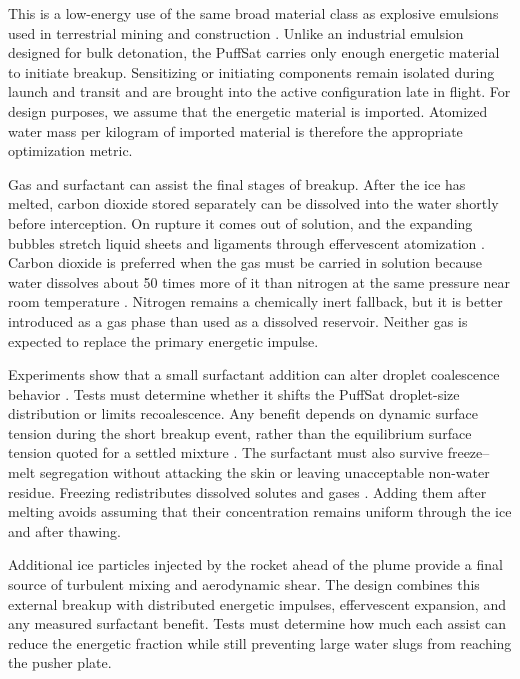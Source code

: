 \documentclass{article}
\begin{document}
This is a low-energy use of the same broad material class as explosive emulsions used in terrestrial mining and construction \cite{emulsion_tutorial}. Unlike an industrial emulsion designed for bulk detonation, the PuffSat carries only enough energetic material to initiate breakup. Sensitizing or initiating components remain isolated during launch and transit and are brought into the active configuration late in flight. For design purposes, we assume that the energetic material is imported. Atomized water mass per kilogram of imported material is therefore the appropriate optimization metric.

Gas and surfactant can assist the final stages of breakup. After the ice has melted, carbon dioxide stored separately can be dissolved into the water shortly before interception. On rupture it comes out of solution, and the expanding bubbles stretch liquid sheets and ligaments through effervescent atomization \cite{sovani2001effervescent}. Carbon dioxide is preferred when the gas must be carried in solution because water dissolves about 50 times more of it than nitrogen at the same pressure near room temperature \cite{sander2023_henry}. Nitrogen remains a chemically inert fallback, but it is better introduced as a gas phase than used as a dissolved reservoir. Neither gas is expected to replace the primary energetic impulse.

Experiments show that a small surfactant addition can alter droplet coalescence behavior \cite{pan2016_surfactant_coalescence}. Tests must determine whether it shifts the PuffSat droplet-size distribution or limits recoalescence. Any benefit depends on dynamic surface tension during the short breakup event, rather than the equilibrium surface tension quoted for a settled mixture \cite{shavit1995_dynamic_surface_tension}. The surfactant must also survive freeze--melt segregation without attacking the skin or leaving unacceptable non-water residue. Freezing redistributes dissolved solutes and gases \cite{killawee1998_freezing}. Adding them after melting avoids assuming that their concentration remains uniform through the ice and after thawing.

Additional ice particles injected by the rocket ahead of the plume provide a final source of turbulent mixing and aerodynamic shear. The design combines this external breakup with distributed energetic impulses, effervescent expansion, and any measured surfactant benefit. Tests must determine how much each assist can reduce the energetic fraction while still preventing large water slugs from reaching the pusher plate.
\end{document}
